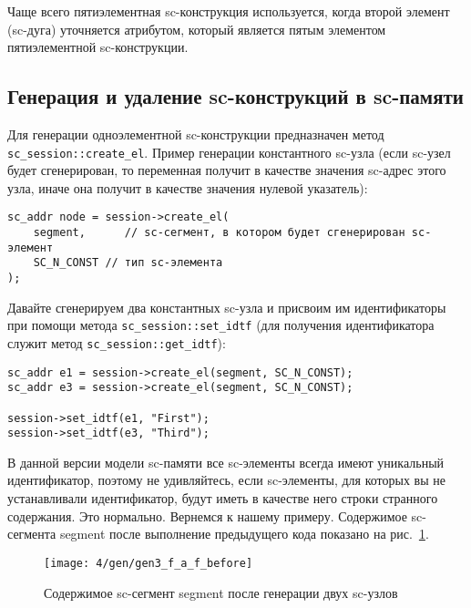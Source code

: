 Чаще всего пятиэлементная sc-конструкция используется, когда второй
элемент (sc-дуга) уточняется атрибутом, который является пятым
элементом пятиэлементной sc-конструкции.

\subsection{Генерация и удаление sc-конструкций в sc-памяти}
\label{sec:libsc_gen_erase}

Для генерации одноэлементной sc-конструкции предназначен метод
\lstinline{sc_session::create_el}. Пример генерации константного
sc-узла (если sc-узел будет сгенерирован, то переменная получит в
качестве значения sc-адрес этого узла, иначе она получит в качестве
значения нулевой указатель):

\begin{lstlisting}[texcl]
sc_addr node = session->create_el(
    segment,      // sc-сегмент, в котором будет сгенерирован sc-элемент
    SC_N_CONST // тип sc-элемента
);
\end{lstlisting}

Давайте сгенерируем два константных sc-узла и присвоим им
идентификаторы при помощи метода \lstinline{sc_session::set_idtf} (для
получения идентификатора служит метод
\lstinline{sc_session::get_idtf}):

\begin{lstlisting}[texcl]
sc_addr e1 = session->create_el(segment, SC_N_CONST);
sc_addr e3 = session->create_el(segment, SC_N_CONST);

session->set_idtf(e1, "First");
session->set_idtf(e3, "Third");
\end{lstlisting}

В данной версии модели sc-памяти все sc-элементы всегда имеют
уникальный идентификатор, поэтому не удивляйтесь, если sc-элементы,
для которых вы не устанавливали идентификатор, будут иметь в качестве
него строки странного содержания. Это нормально. Вернемся к нашему
примеру.  Содержимое sc-сегмента segment после выполнение предыдущего
кода показано на рис.~\ref{fig:gen3_f_a_f_before}.

\begin{figure}
  \centering
  \texttt{[image: 4/gen/gen3\_f\_a\_f\_before]}
  \caption{Содержимое sc-сегмент segment после генерации двух sc-узлов}
  \label{fig:gen3_f_a_f_before}
\end{figure}

